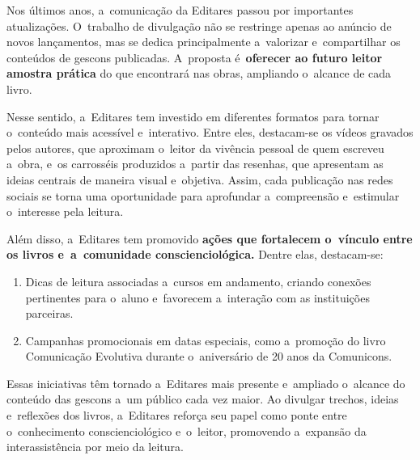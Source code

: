 \documentclass{gescons}
\begin{document}
    \begin{multicols}{2}


Nos últimos anos, a~comunicação da Editares passou por importantes atualizações. O~trabalho de divulgação não se restringe apenas ao anúncio de novos lançamentos, mas se dedica principalmente a~valorizar e~compartilhar os conteúdos de gescons publicadas. A~proposta é~\textbf{oferecer ao futuro leitor amostra prática} do que encontrará nas obras, ampliando o~alcance de cada livro.

Nesse sentido, a~Editares tem investido em diferentes formatos para tornar o~conteúdo mais acessível e~interativo. Entre eles, destacam-se os vídeos gravados pelos autores, que aproximam o~leitor da vivência pessoal de quem escreveu a~obra, e~os carrosséis produzidos a~partir das resenhas, que apresentam as ideias centrais de maneira visual e~objetiva. Assim, cada publicação nas redes sociais se torna uma oportunidade para aprofundar a~compreensão e~estimular o~interesse pela leitura.

Além disso, a~Editares tem promovido \textbf{ações que fortalecem o~vínculo entre os livros e~a~comunidade conscienciológica.} Dentre elas, destacam-se:

\begin{enumerate}
\def\labelenumi{\arabic{enumi}.}
\item
  Dicas de leitura associadas a~cursos em andamento, criando conexões pertinentes para o~aluno e~favorecem a~interação com as instituições parceiras.
\item
  Campanhas promocionais em datas especiais, como a~promoção do livro Comunicação Evolutiva durante o~aniversário de 20 anos da Comunicons.
\end{enumerate}

Essas iniciativas têm tornado a~Editares mais presente e~ampliado o~alcance do conteúdo das gescons a~um público cada vez maior. Ao divulgar trechos, ideias e~reflexões dos livros, a~Editares reforça seu papel como ponte entre o~conhecimento conscienciológico e~o~leitor, promovendo a~expansão da interassistência por meio da leitura.






    \end{multicols}
\end{document}

